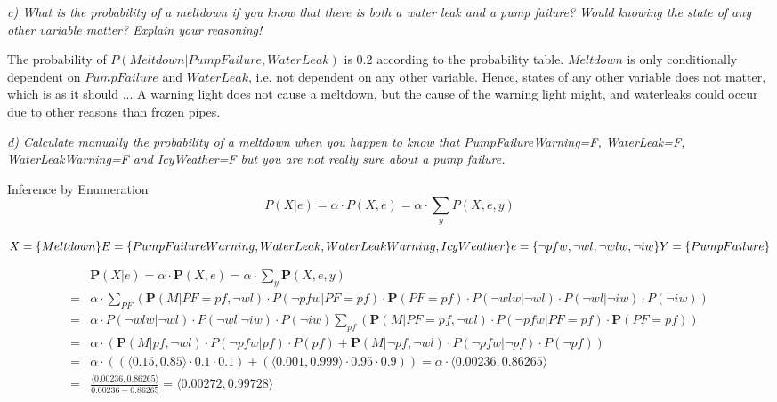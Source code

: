 \begin{framed}\em c) What is the probability of a meltdown if you know that there is both a water leak and a pump failure? Would knowing the state of any other variable matter? Explain your reasoning!\em\end{framed}

The probability of $P(Meltdown|PumpFailure, WaterLeak)$ is 0.2 according to the probability table. $Meltdown$ is only conditionally dependent on $PumpFailure$ and $WaterLeak$, i.e. not dependent on any other variable. Hence, states of any other variable does not matter, which is as it should ... A warning light does not cause a meltdown, but the cause of the warning light might, and waterleaks could occur due to other reasons than frozen pipes.

\begin{framed}\em d) Calculate manually the probability of a meltdown when you happen to know that PumpFailureWarning=F, WaterLeak=F, WaterLeakWarning=F and IcyWeather=F but you are not really sure about a pump failure. \em\end{framed}
\newpage

Inference by Enumeration
$$P(X|e) = \alpha\cdot P(X,e) = \alpha\cdot\sum_{y}P(X,e,y)$$

$X = \{Meltdown\}\\E=\{PumpFailureWarning, WaterLeak, WaterLeakWarning, IcyWeather\}\\e=\{\neg pfw, \neg wl, \neg wlw,\neg iw\}\\Y=\{PumpFailure\}$

\begin{align*}
  & \textbf{P}(X|e) = \alpha\cdot \textbf{P}(X,e) = \alpha\cdot\sum_{y}\textbf{P}(X,e,y)\\
  = & \alpha\cdot\sum_{PF}(\textbf{P}(M|PF=pf,\neg wl)\cdot
  P(\neg pfw | PF = pf)\cdot
  \textbf{P}(PF=pf)\cdot
  P(\neg wlw | \neg wl)\cdot
  P(\neg wl | \neg iw)\cdot
  P(\neg iw))\\
  = & \alpha\cdot %
  P(\neg wlw | \neg wl)\cdot P(\neg wl | \neg iw)\cdot P(\neg iw)
  \sum_{pf}(\textbf{P}(M|PF = pf,\neg wl)\cdot
  P(\neg pfw|PF=pf)\cdot \textbf{P}(PF=pf))\\
  = & \alpha\cdot(\textbf{P}(M|pf,\neg wl)\cdot P(\neg pfw|pf)\cdot P(pf)
  + \textbf{P}(M|\neg pf, \neg wl)\cdot P(\neg pfw| \neg pf)\cdot P(\neg pf))\\
  = & \alpha\cdot((\langle 0.15,0.85\rangle \cdot 0.1\cdot 0.1)+(\langle 0.001, 0.999\rangle \cdot 0.95 \cdot 0.9))
  = \alpha\cdot\langle 0.00236,0.86265 \rangle\\
  = & \frac{\langle 0.00236,0.86265 \rangle}{0.00236+0.86265} = \langle 0.00272,0.99728  \rangle
\end{align*}

